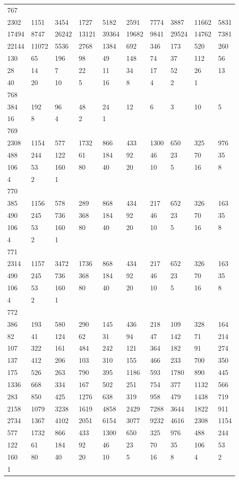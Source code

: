 \begin{longtable}{*{10}{l}}
767&&&&&&&&&\\
2302& 1151& 3454& 1727& 5182& 2591& 7774& 3887& 11662& 5831\\
17494& 8747& 26242& 13121& 39364& 19682& 9841& 29524& 14762& 7381\\
22144& 11072& 5536& 2768& 1384& 692& 346& 173& 520& 260\\
130& 65& 196& 98& 49& 148& 74& 37& 112& 56\\
28& 14& 7& 22& 11& 34& 17& 52& 26& 13\\
40& 20& 10& 5& 16& 8& 4& 2& 1& \\

768&&&&&&&&&\\
384& 192& 96& 48& 24& 12& 6& 3& 10& 5\\
16& 8& 4& 2& 1& \\

769&&&&&&&&&\\
2308& 1154& 577& 1732& 866& 433& 1300& 650& 325& 976\\
488& 244& 122& 61& 184& 92& 46& 23& 70& 35\\
106& 53& 160& 80& 40& 20& 10& 5& 16& 8\\
4& 2& 1& \\

770&&&&&&&&&\\
385& 1156& 578& 289& 868& 434& 217& 652& 326& 163\\
490& 245& 736& 368& 184& 92& 46& 23& 70& 35\\
106& 53& 160& 80& 40& 20& 10& 5& 16& 8\\
4& 2& 1& \\

771&&&&&&&&&\\
2314& 1157& 3472& 1736& 868& 434& 217& 652& 326& 163\\
490& 245& 736& 368& 184& 92& 46& 23& 70& 35\\
106& 53& 160& 80& 40& 20& 10& 5& 16& 8\\
4& 2& 1& \\

772&&&&&&&&&\\
386& 193& 580& 290& 145& 436& 218& 109& 328& 164\\
82& 41& 124& 62& 31& 94& 47& 142& 71& 214\\
107& 322& 161& 484& 242& 121& 364& 182& 91& 274\\
137& 412& 206& 103& 310& 155& 466& 233& 700& 350\\
175& 526& 263& 790& 395& 1186& 593& 1780& 890& 445\\
1336& 668& 334& 167& 502& 251& 754& 377& 1132& 566\\
283& 850& 425& 1276& 638& 319& 958& 479& 1438& 719\\
2158& 1079& 3238& 1619& 4858& 2429& 7288& 3644& 1822& 911\\
2734& 1367& 4102& 2051& 6154& 3077& 9232& 4616& 2308& 1154\\
577& 1732& 866& 433& 1300& 650& 325& 976& 488& 244\\
122& 61& 184& 92& 46& 23& 70& 35& 106& 53\\
160& 80& 40& 20& 10& 5& 16& 8& 4& 2\\
1& \\


\end{longtable}
